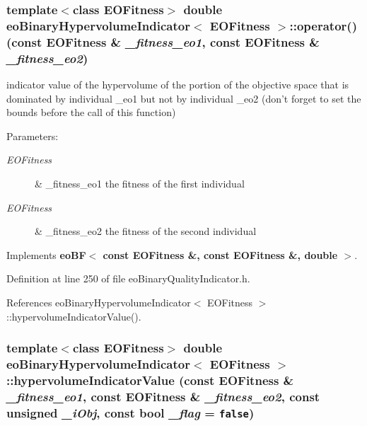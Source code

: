 \subsubsection{\setlength{\rightskip}{0pt plus 5cm}template$<$class EOFitness$>$ double {\bf eo\-Binary\-Hypervolume\-Indicator}$<$ EOFitness $>$::operator() (const EOFitness \& {\em \_\-fitness\_\-eo1}, const EOFitness \& {\em \_\-fitness\_\-eo2})\hspace{0.3cm}{\tt  [inline, virtual]}}\label{classeoBinaryHypervolumeIndicator_d418f42f086a3221c60ad9149b5df9d0}


indicator value of the hypervolume of the portion of the objective space that is dominated by individual \_\-eo1 but not by individual \_\-eo2 (don't forget to set the bounds before the call of this function) 

\begin{Desc}
\item[Parameters:]
\begin{description}
\item[{\em EOFitness}]\& \_\-fitness\_\-eo1 the fitness of the first individual \item[{\em EOFitness}]\& \_\-fitness\_\-eo2 the fitness of the second individual \end{description}
\end{Desc}


Implements {\bf eo\-BF$<$ const EOFitness \&, const EOFitness \&, double $>$}.

Definition at line 250 of file eo\-Binary\-Quality\-Indicator.h.

References eo\-Binary\-Hypervolume\-Indicator$<$ EOFitness $>$::hypervolume\-Indicator\-Value().
\subsubsection{\setlength{\rightskip}{0pt plus 5cm}template$<$class EOFitness$>$ double {\bf eo\-Binary\-Hypervolume\-Indicator}$<$ EOFitness $>$::hypervolume\-Indicator\-Value (const EOFitness \& {\em \_\-fitness\_\-eo1}, const EOFitness \& {\em \_\-fitness\_\-eo2}, const unsigned {\em \_\-i\-Obj}, const bool {\em \_\-flag} = {\tt false})\hspace{0.3cm}{\tt  [inline, private]}}\label{classeoBinaryHypervolumeIndicator_9c12e672eaf7ed2b17cab9b96af911e6}


